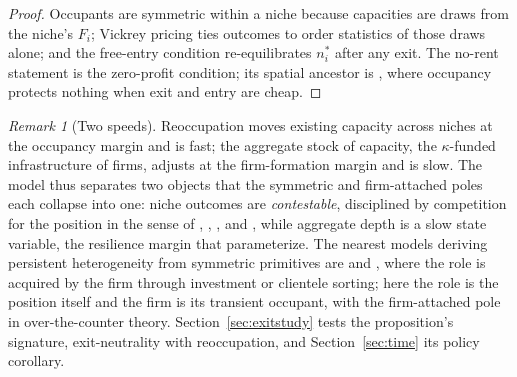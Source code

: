 \documentclass[11pt]{article}
\theoremstyle{plain}
\theoremstyle{definition}
\theoremstyle{remark}
\newtheorem{remark}{Remark}
\begin{document}
\begin{proof}
Occupants are symmetric within a niche because capacities are draws from the niche's $F_i$; Vickrey pricing ties outcomes to order statistics of those draws alone; and the free-entry condition re-equilibrates $n^\ast_i$ after any exit. The no-rent statement is the zero-profit condition; its spatial ancestor is \citet{judd1985preemption}, where occupancy protects nothing when exit and entry are cheap.
\end{proof}

\begin{remark}[Two speeds]\label{rem:twospeeds}
Reoccupation moves existing capacity across niches at the occupancy margin and is fast; the aggregate stock of capacity, the $\kappa$-funded infrastructure of firms, adjusts at the firm-formation margin and is slow. The model thus separates two objects that the symmetric and firm-attached poles each collapse into one: niche outcomes are \emph{contestable}, disciplined by competition for the position in the sense of \citet{chadwick1859field}, \citet{demsetz1968utilities}, \citet{williamson1976franchise}, and \citet{baumol1982contestable}, while aggregate depth is a slow state variable, the resilience margin that \citet{atkeson2015entry} parameterize. The nearest models deriving persistent heterogeneity from symmetric primitives are \citet{farboodi2023emergence} and \citet{sambalaibat2025clienteles}, where the role is acquired by the firm through investment or clientele sorting; here the role is the position itself and the firm is its transient occupant, with \citet{hugonnier2020frictional} the firm-attached pole in over-the-counter theory. Section~\ref{sec:exitstudy} tests the proposition's signature, exit-neutrality with reoccupation, and Section~\ref{sec:time} its policy corollary.
\end{remark}
\end{document}
